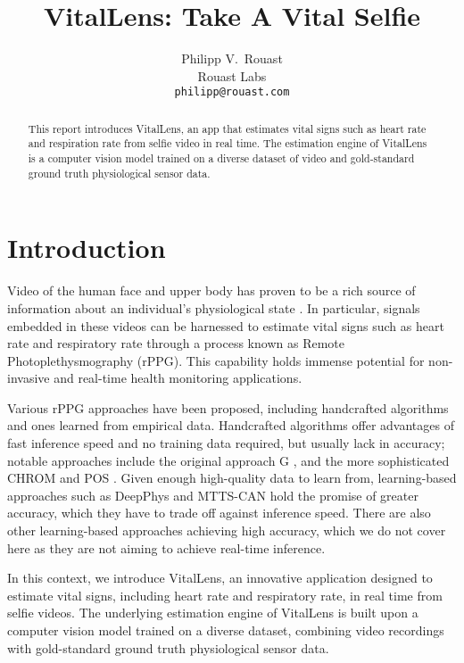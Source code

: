 \documentclass{article}
\title{VitalLens: Take A Vital Selfie}
\author{%
  Philipp V.~Rouast \\
  Rouast Labs\\
  \texttt{philipp@rouast.com} \\
}
\begin{document}
\maketitle


\begin{abstract}
This report introduces VitalLens, an app that estimates vital signs such as heart rate and respiration rate from selfie video in real time.
The estimation engine of VitalLens is a computer vision model trained on a diverse dataset of video and gold-standard ground truth physiological sensor data.
\end{abstract}


\section{Introduction}
\label{sec:introduction}

Video of the human face and upper body has proven to be a rich source of information about an individual's physiological state \cite{verkruysse2008remote}.
In particular, signals embedded in these videos can be harnessed to estimate vital signs such as heart rate and respiratory rate through a process known as Remote Photoplethysmography (rPPG).
This capability holds immense potential for non-invasive and real-time health monitoring applications.

Various rPPG approaches have been proposed, including handcrafted algorithms and ones learned from empirical data.
Handcrafted algorithms offer advantages of fast inference speed and no training data required, but usually lack in accuracy; notable approaches include the original approach G \cite{verkruysse2008remote}, and the more sophisticated CHROM \cite{de2013robust} and POS \cite{wang2017algorithmic}.
Given enough high-quality data to learn from, learning-based approaches such as DeepPhys \cite{chen2018deep} and MTTS-CAN \cite{liu2020multi} hold the promise of greater accuracy, which they have to trade off against inference speed.
There are also other learning-based approaches achieving high accuracy, which we do not cover here as they are not aiming to achieve real-time inference.

In this context, we introduce VitalLens, an innovative application designed to estimate vital signs, including heart rate and respiratory rate, in real time from selfie videos.
The underlying estimation engine of VitalLens is built upon a computer vision model trained on a diverse dataset, combining video recordings with gold-standard ground truth physiological sensor data.
\end{document}
